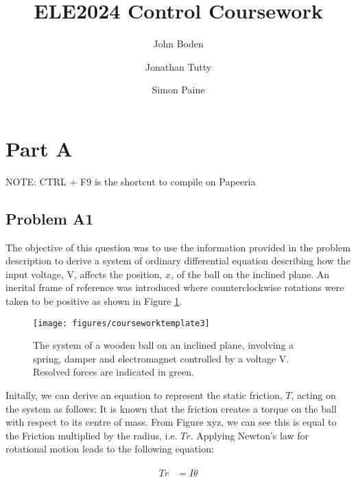 \documentclass[a4paper,10pt,reqno]{amsart}
\title[ELE2024 Coursework]{ELE2024 Control Coursework}
\author[J. Boden]{John Boden}
\author[J. Tutty]{Jonathan Tutty}
\author[S. Paine]{Simon Paine}
\numberwithin{equation}{section}
\begin{document}
\maketitle

\section{Part A}

NOTE: CTRL + F9 is the shortcut to compile on Papeeria

\subsection{Problem A1}\label{sec:a1}
The objective of this question was to use the information provided in the problem description to derive a system of ordinary differential equation describing how the input voltage, V, affects the position, $x$, of the ball on the inclined plane.
\newline An inerital frame of reference was introduced where counterclockwise rotations were taken to be positive as shown in Figure \ref{fig:system}.

\begin{figure}[h]
\centering
\texttt{[image: figures/courseworktemplate3]}
\caption{The system of a wooden ball on an inclined plane, involving a spring, damper and electromagnet controlled by a voltage V. Resolved forces are indicated in green.}
\label{fig:system}
\end{figure}

\newline Initally, we can derive an equation to represent the static friction, $T$, acting on the system as follows:
\newline It is known that the friction creates a torque on the ball with respect to its centre of mass. From Figure xyz, we can see this is equal to the Friction multiplied by the radius, i.e. $Tr$.
\newline Applying Newton's law for rotational motion leads to the following equation:

\begin{align}
\label{1.1}
Tr &= I\ddot{\theta}
\end{align}
\end{document}
